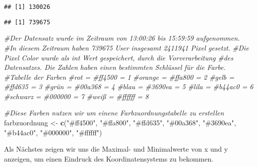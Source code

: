 \documentclass[
]{article}
\newenvironment{Shaded}{\begin{snugshade}}{\end{snugshade}}
\newcommand{\CommentTok}[1]{\textcolor[rgb]{0.56,0.35,0.01}{\textit{#1}}}
\newcommand{\FunctionTok}[1]{\textcolor[rgb]{0.13,0.29,0.53}{\textbf{#1}}}
\newcommand{\NormalTok}[1]{#1}
\newcommand{\OtherTok}[1]{\textcolor[rgb]{0.56,0.35,0.01}{#1}}
\newcommand{\SpecialCharTok}[1]{\textcolor[rgb]{0.81,0.36,0.00}{\textbf{#1}}}
\newcommand{\StringTok}[1]{\textcolor[rgb]{0.31,0.60,0.02}{#1}}
\begin{document}
\begin{verbatim}
## [1] 130026
\end{verbatim}

\begin{Shaded}
\end{Shaded}

\begin{verbatim}
## [1] 739675
\end{verbatim}

\begin{Shaded}
\begin{Highlighting}[]
\CommentTok{\#Der Datensatz wurde im Zeitraum von 13:00:26 bis 15:59:59 aufgenommen.}
\CommentTok{\#In diesem Zeitraum haben 739675 User insgesamt 2411941 Pixel gesetzt.}
\CommentTok{\#Die Pixel Color wurde als int Wert gespeichert, durch die Vorverarbeitung}
\CommentTok{\#des Datensatzes. Die Zahlen haben einen bestimmten Schlüssel für die Farbe.}
\CommentTok{\#Tabelle der Farben}
\CommentTok{\#rot = \#ff4500 = 1}
\CommentTok{\#orange = \#ffa800 = 2}
\CommentTok{\#gelb = \#ffd635  = 3}
\CommentTok{\#grün = \#00a368 = 4}
\CommentTok{\#blau = \#3690ea = 5}
\CommentTok{\#lila = \#b44ac0 = 6}
\CommentTok{\#schwarz = \#000000 = 7}
\CommentTok{\#weiß = \#ffffff = 8}
\end{Highlighting}
\end{Shaded}

\begin{Shaded}
\begin{Highlighting}[]
\CommentTok{\#Diese Farben nutzen wir um einene Farbzuordnungstabelle zu erstellen}
\NormalTok{farbzuordnung }\OtherTok{\textless{}{-}} \FunctionTok{c}\NormalTok{(}\StringTok{"\#ff4500"}\NormalTok{, }\StringTok{"\#ffa800"}\NormalTok{, }\StringTok{"\#ffd635"}\NormalTok{, }\StringTok{"\#00a368"}\NormalTok{,}
                \StringTok{"\#3690ea"}\NormalTok{, }\StringTok{"\#b44ac0"}\NormalTok{, }\StringTok{"\#000000"}\NormalTok{, }\StringTok{"\#ffffff"}\NormalTok{)}
\end{Highlighting}
\end{Shaded}

Als Nächstes zeigen wir uns die Maximal- und Minimalwerte von x und y
anzeigen, um einen Eindruck des Koordinatensystems zu bekommen.
\end{document}
